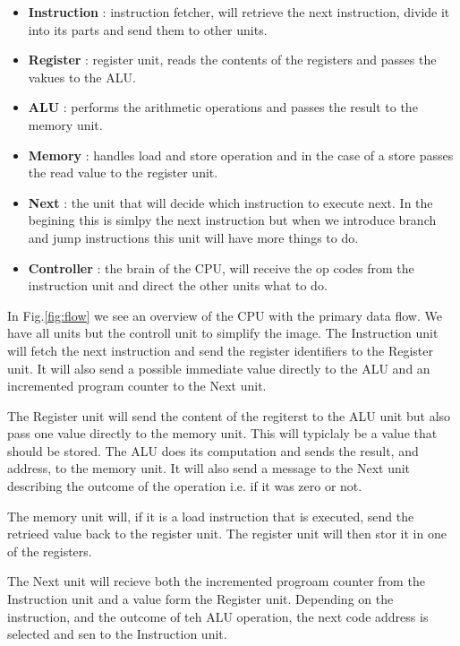\documentclass[a4paper,11pt]{article}
\begin{document}
\begin{itemize}

\item {\bf Instruction} : instruction fetcher, will retrieve the next
  instruction, divide it into its parts and send them to other units.

\item {\bf Register} : register unit, reads the contents of the registers
  and passes the vakues to the ALU.

\item {\bf ALU} : performs the arithmetic operations and passes the result to the memory unit.

\item {\bf Memory} : handles load and store operation and in the case
  of a store passes the read value to the register unit.

\item {\bf Next} : the unit that will decide which instruction to
  execute next. In the begining this is simlpy the next instruction
  but when we introduce branch and jump instructions this unit will
  have more things to do.

\item {\bf Controller} : the brain of the CPU, will receive the op
  codes from the instruction unit and direct the other units what to do.
  
\end{itemize}

In Fig.\ref{fig:flow} we see an overview of the CPU with the primary
data flow. We have all units but the controll unit to simplify the
image. The Instruction unit will fetch the next instruction and send the
register identifiers to the Register unit. It will also send a
possible immediate value directly to the ALU and an incremented
program counter to the Next unit.

The Register unit will send the content of the regiterst to the ALU
unit but also pass one value directly to the memory unit.  This will
typiclaly be a value that should be stored. The ALU does its
computation and sends the result, and address, to the memory unit. It
will also send a message to the Next unit describing the outcome of
the operation i.e. if it was zero or not.

The memory unit will, if it is a load instruction that is executed,
send the retrieed value back to the register unit. The register unit
will then stor it in one of the registers.

The Next unit will recieve both the incremented progroam counter from
the Instruction unit and a value form the Register unit. Depending on the
instruction, and the outcome of teh ALU operation, the next code
address is selected and sen to the Instruction unit.
\end{document}
